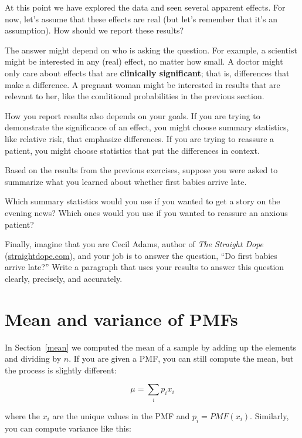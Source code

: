 \documentclass[12pt]{book}
\begin{document}
At this point we have explored the data and seen several apparent
effects.  For now, let's assume that these effects are real (but let's
remember that it's an assumption).  How should we report these
results?

The answer might depend on who is asking the question.  For example,
a scientist might be interested in any (real) effect, no matter how
small.  A doctor might only care about effects that are
{\bf clinically significant}; that is, differences that make a difference.
A pregnant woman might be interested in results that are relevant to
her, like the conditional probabilities in the previous section.

How you report results also depends on your goals.  If you are
trying to demonstrate the significance of an effect, you might choose
summary statistics, like relative risk, that emphasize differences.
If you are trying to reassure a patient, you might choose statistics
that put the differences in context.

\begin{ex}

Based on the results from the previous exercises, suppose you were
asked to summarize what you learned about whether first
babies arrive late.

Which summary statistics would you use if you wanted to get a story
on the evening news?  Which ones would you use if you wanted to
reassure an anxious patient?

Finally, imagine that you are Cecil Adams, author of {\it The Straight
  Dope} (\url{straightdope.com}), and your job is to answer the
question, ``Do first babies arrive late?''  Write a paragraph that
uses your results to answer this question clearly, precisely, and
accurately.

\end{ex}


\section{Mean and variance of PMFs}

In Section~\ref{mean} we computed the mean of a sample by adding up
the elements and dividing by $n$.  If you are given a PMF, you can
still compute the mean, but the process is slightly different:

\[ \mu = \sum_i p_i x_i \]

where the $x_i$ are the unique values in the PMF and $p_i = PMF(x_i)$.
Similarly, you can compute variance like this:
\end{document}

